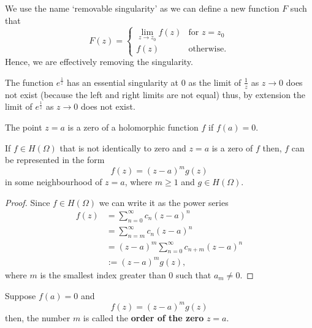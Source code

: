 \documentclass[12pt, a4paper]{article}
\begin{document}
\begin{mdnote}
    We use the name `removable singularity' as we can define a new function \(F\) such that 
    \[F(z) = \begin{cases}
        \lim_{z\to z_0} f(z) &\text{for } z=z_0 \\
        f(z) &\text{otherwise.}
    \end{cases}\]
    Hence, we are effectively removing the singularity.
\end{mdnote}

\begin{mdexample}
    The function \(e^{\frac{1}{z}}\) has an essential singularity at \(0\) as the limit of \(\frac{1}{z}\) as \(z \to 0\) does not exist (because the left and right limits are not equal) thus, by extension the limit of \(e^{\frac{1}{z}}\) as \(z \to 0\) does not exist.
\end{mdexample}

\begin{definition}
    The point \(z=a\) is a zero of a holomorphic function \(f\) if \(f(a)=0\).
\end{definition}

\begin{lemma}
    If \(f \in H(\Omega)\) that is not identically to zero and \(z=a\) is a zero of \(f\) then, \(f\) can be represented in the form 
    \[f(z)=(z-a)^m g(z)\]
    in some neighbourhood of \(z=a\), where \(m \geq 1\) and \(g \in H(\Omega)\).
\end{lemma}

\begin{proof}
    Since \(f \in H(\Omega)\) we can write it as the power series 
    \[\begin{aligned}
        f(z) &= \sum_{n=0}^{\infty} c_n(z-a)^n \\
        &= \sum_{n=m}^{\infty} c_n(z-a)^n \\
        &= (z-a)^m \sum_{n=0}^{\infty} c_{n+m} (z-a)^n \\
        &:=(z-a)^m g(z),
    \end{aligned}\]
    where \(m\) is the smallest index greater than \(0\) such that \(a_m \neq 0\).
\end{proof}

\begin{definition}
    Suppose \(f(a)=0\) and 
    \[f(z)=(z-a)^m g(z)\]
    then, the number \(m\) is called the \textbf{order of the zero} \(z=a\).
\end{definition}
\end{document}
